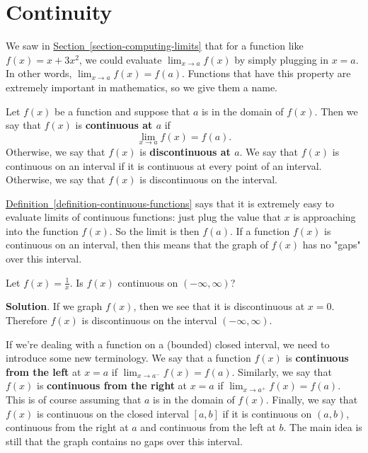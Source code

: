 \documentclass[10pt,]{book}
\newcommand{\terminology}[1]{\textbf{#1}}
\theoremstyle{ptxplainnotitle}
\theoremstyle{ptxplaintitle}
\theoremstyle{ptxplainnotitle}
\theoremstyle{ptxplaintitle}
\theoremstyle{ptxplainnotitle}
\theoremstyle{ptxplaintitle}
\theoremstyle{ptxdefinitionnotitle}
\theoremstyle{ptxdefinitiontitle}
\theoremstyle{ptxdefinitionnotitle}
\theoremstyle{ptxdefinitiontitle}
\theoremstyle{ptxdefinitionnotitle}
\theoremstyle{ptxdefinitiontitle}
\theoremstyle{ptxdefinitionnotitle}
\theoremstyle{ptxdefinitiontitle}
\theoremstyle{ptxdefinitionnotitle}
\theoremstyle{ptxdefinitiontitle}
\numberwithin{equation}{section}
\begin{document}
\section[{Continuity}]{Continuity}\label{section-continuity}
\hypertarget{p-31}{}%
We saw in \hyperref[section-computing-limits]{Section~\ref{section-computing-limits}} that for a function like \(f(x) = x+3x^{2}\), we could evaluate \(\lim_{x\to a}f(x)\) by simply plugging in \(x=a\). In other words, \(\lim_{x\to a}f(x) = f(a)\). Functions that have this property are extremely important in mathematics, so we give them a name.%
\begin{definition}\label{definition-continuous-functions}
\hypertarget{p-32}{}%
Let \(f(x)\) be a function and suppose that \(a\) is in the domain of \(f(x)\). Then we say that \(f(x)\) is \terminology{continuous at \(a\)} if%
\begin{equation*}
\lim_{x\to a}f(x) = f(a)\text{.}
\end{equation*}
Otherwise, we say that \(f(x)\) is \terminology{discontinuous at \(a\)}. We say that \(f(x)\) is continuous on an interval if it is continuous at every point of an interval. Otherwise, we say that \(f(x)\) is discontinuous on the interval.%
\end{definition}
\hypertarget{p-33}{}%
\hyperref[definition-continuous-functions]{Definition~\ref{definition-continuous-functions}} says that it is extremely easy to evaluate limits of continuous functions: just plug the value that \(x\) is approaching into the function \(f(x)\). So the limit is then \(f(a)\). If a function \(f(x)\) is continuous on an interval, then this means that the graph of \(f(x)\) has no "gaps" over this interval.%
\begin{example}\label{example-determining-if-a-function-is-continuous}
\hypertarget{p-34}{}%
Let \(f(x) = \frac{1}{x}\). Is \(f(x)\) continuous on \((-\infty,\infty)\)?%
\par\smallskip%
\noindent\textbf{Solution}.\hypertarget{solution-6}{}\quad%
\hypertarget{p-35}{}%
If we graph \(f(x)\), then we see that it is discontinuous at \(x=0\). Therefore \(f(x)\) is discontinuous on the interval \((-\infty,\infty)\).%
\end{example}
\hypertarget{p-36}{}%
If we're dealing with a function on a (bounded) closed interval, we need to introduce some new terminology. We say that a function \(f(x)\) is \terminology{continuous from the left} at \(x=a\) if \(\lim_{x\to a^{-}}f(x) = f(a)\). Similarly, we say that \(f(x)\) is \terminology{continuous from the right} at \(x=a\) if \(\lim_{x\to a^{+}}f(x) = f(a)\). This is of course assuming that \(a\) is in the domain of \(f(x)\). Finally, we say that \(f(x)\) is continuous on the closed interval \([a,b]\) if it is continuous on \((a,b)\), continuous from the right at \(a\) and continuous from the left at \(b\). The main idea is still that the graph contains no gaps over this interval.%
\end{document}
